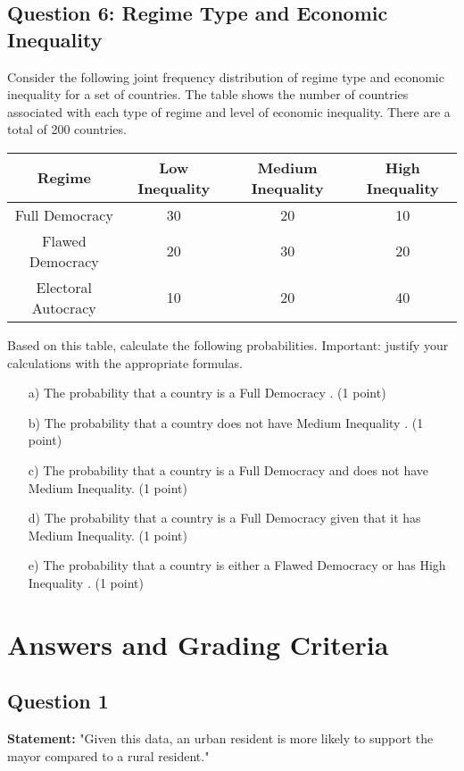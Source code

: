 \documentclass{article}
\begin{document}
\subsection*{Question 6: Regime Type and Economic Inequality}

Consider the following joint frequency distribution of regime type and economic inequality for a set of countries. The table shows the number of countries associated with each type of regime and level of economic inequality. There are a total of 200 countries.

\begin{table}[h!]
\centering
\begin{tabular}{|c|c|c|c|}
\hline
Regime & Low Inequality & Medium Inequality & High Inequality \\
\hline
Full Democracy & 30 & 20 & 10 \\ %
\hline
Flawed Democracy & 20 & 30 & 20 \\ %
\hline
Electoral Autocracy  & 10 & 20 & 40 \\ %
\hline
\end{tabular}
\end{table}

Based on this table, calculate the following probabilities. Important: justify your calculations with the appropriate formulas.

\begin{enumerate}
    \item[a)] The probability that a country is a Full Democracy . (1 point)
    \item[b)] The probability that a country does not have Medium Inequality . (1 point)
    \item[c)] The probability that a country is a Full Democracy and does not have Medium Inequality. (1 point)
    \item[d)] The probability that a country is a Full Democracy given that it has Medium Inequality. (1 point)
    \item[e)] The probability that a country is either a Flawed Democracy or has High Inequality . (1 point)
\end{enumerate}

\newpage
\section*{Answers and Grading Criteria}

\subsection*{Question 1}
\textbf{Statement:} "Given this data, an urban resident is more likely to support the mayor compared to a rural resident."
\end{document}
